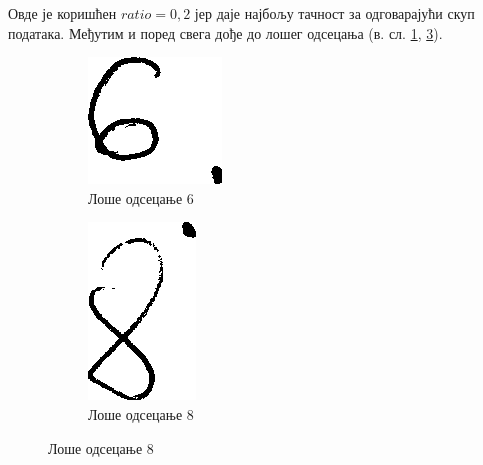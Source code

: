Овде је коришћен $ratio= 0, 2$  јер даје најбољу тачност за одговарајући скуп података. Међутим и поред свега дође до лошег одсецања (в. сл. \ref{pic:badCrop6}, \ref{pic:badCrop8}).
\begin{figure}[htb!]
\caption{Лоше одсецање}
\begin{subfigure}{.5\textwidth}
\centering
\includegraphics[width=.5\linewidth]{pictures/1/BadCrop6}
\caption{Лоше одсецање 6}\label{pic:badCrop6}
\end{subfigure}
\begin{subfigure}{.5\textwidth}
\centering
\includegraphics[width=.3\linewidth]{pictures/1/BadCrop8}
\caption{Лоше одсецање 8}\label{pic:badCrop8}
\end{subfigure}
\end{figure}

